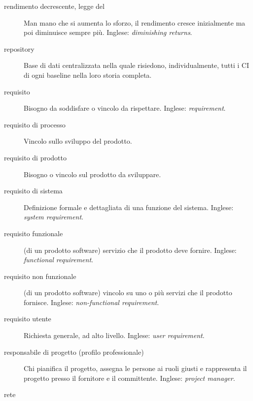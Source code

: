 \documentclass[a4paper]{article}
\begin{document}
\begin{description}
	\item[rendimento decrescente, legge del] 

			Man mano che si aumenta lo sforzo, il rendimento cresce inizialmente ma poi diminuisce sempre più. Inglese: \emph{diminishing returns}.
			
	\item[repository] 

			Base di dati centralizzata nella quale risiedono, individualmente, tutti i CI di ogni baseline nella loro storia completa.
			
	\item[requisito] 

			Bisogno da soddisfare o vincolo da rispettare. Inglese: \emph{requirement}.
			
	\item[requisito di processo] 

			Vincolo sullo sviluppo del prodotto.
			
	\item[requisito di prodotto] 

			Bisogno o vincolo sul prodotto da sviluppare.
			
	\item[requisito di sistema] 

			Definizione formale e dettagliata di una funzione del sistema. Inglese: \emph{system requirement}.
			
	\item[requisito funzionale] 

			(di un prodotto software) servizio che il prodotto deve fornire. Inglese: \emph{functional requirement}.
			
	\item[requisito non funzionale] 

			(di un prodotto software) vincolo su uno o più servizi che il prodotto fornisce. Inglese: \emph{non-functional requirement}.
			
	\item[requisito utente] 

			Richiesta generale, ad alto livello. Inglese: \emph{user requirement}.
			
	\item[responsabile di progetto (profilo professionale)] 

			Chi pianifica il progetto, assegna le persone ai ruoli giusti e rappresenta il progetto presso il fornitore e il committente. Inglese: \emph{project manager}.
			
	\item[rete] 


\end{description}
\end{document}
